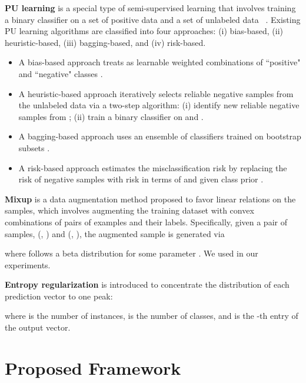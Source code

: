 \documentclass[conference]{IEEEtran}
\begin{document}
\textbf{PU learning} is a special type of semi-supervised learning that involves training a binary classifier on a set of positive data  and a set of unlabeled data ~\cite{li2005learning}. 
Existing PU learning algorithms are classified into four approaches: (i) bias-based, (ii) heuristic-based, (iii) bagging-based, and (iv) risk-based. 

\begin{itemize}
\item A bias-based approach treats  as learnable weighted combinations of ``positive" and ``negative" classes \cite{elkan2008learning}.

\item A heuristic-based approach iteratively selects reliable negative samples from the unlabeled data via a two-step algorithm: (i) identify new reliable negative samples  from ; (ii) train a binary classifier on  and  \cite{liu2002partially}.

\item A bagging-based approach uses an ensemble of classifiers trained on bootstrap subsets \cite{mordelet2014bagging}.

\item A risk-based approach estimates the misclassification risk by replacing the risk of negative samples with risk in terms of  and  given class prior \cite{du2014analysis}.
\end{itemize}

\textbf{Mixup} \cite{zhang2017mixup} is a data augmentation method proposed to favor linear relations on the samples, which involves augmenting the training dataset with convex combinations of pairs of examples and their labels. Specifically, given a pair of samples, (, ) and (, ), the augmented sample is generated via
\vspace*{-0.1em}

\vspace*{-1.1em}

\noindent where  follows a beta distribution for some parameter . We used  in our experiments.

\textbf{Entropy regularization} \cite{tanaka2018joint} is introduced to concentrate the distribution of each prediction vector to one peak:

where  is the number of instances,  is the number of classes, and  is the -th entry of the output vector.
\section{Proposed Framework}
\label{sec: proposed method}
\end{document}
